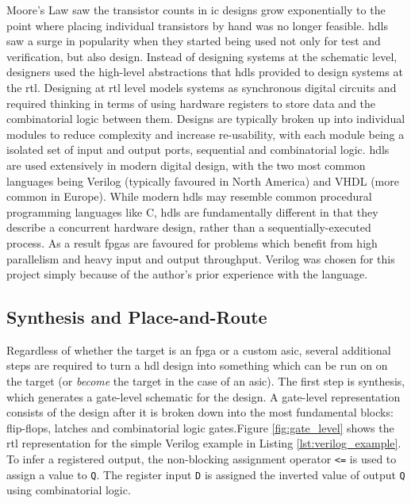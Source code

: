 Moore's Law saw the transistor counts in \gls{ic} designs grow exponentially to the point where placing individual transistors by hand was no longer feasible. \Glspl{hdl} saw a surge in popularity when they started being used not only for test and verification, but also design. Instead of designing systems at the schematic level, designers used the high-level abstractions that \glspl{hdl} provided to design systems at the \gls{rtl}. Designing at \gls{rtl} level models systems as synchronous digital circuits and required thinking in terms of using hardware registers to store data and the combinatorial logic between them. Designs are typically broken up into individual modules to reduce complexity and increase re-usability, with each module being a isolated set of input and output ports, sequential and combinatorial logic. \Glspl{hdl} are used extensively in modern digital design, with the two most common languages being Verilog (typically favoured in North America) and VHDL (more common in Europe). While modern \glspl{hdl} may resemble common procedural programming languages like C, \glspl{hdl} are fundamentally different in that they describe a concurrent hardware design, rather than a sequentially-executed process. As a result \glspl{fpga} are favoured for problems which benefit from high parallelism and heavy input and output throughput. Verilog was chosen for this project simply because of the author's prior experience with the language.

\subsection{Synthesis and Place-and-Route}

Regardless of whether the target is an \gls{fpga} or a custom \gls{asic}, several additional steps are required to turn a \gls{hdl} design into something which can be run on on the target (or \textit{become} the target in the case of an \gls{asic}). The first step is synthesis, which generates a gate-level schematic for the design. A gate-level representation consists of the design after it is broken down into the most fundamental blocks: flip-flops, latches and combinatorial logic gates.Figure \ref{fig:gate_level} shows the \gls{rtl} representation for the simple Verilog example in Listing \ref{lst:verilog_example}. To infer a registered output, the non-blocking assignment operator \texttt{<=} is used to assign a value to \texttt{Q}. The register input \texttt{D} is assigned the inverted value of output \texttt{Q} using combinatorial logic.

